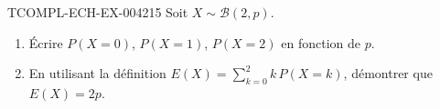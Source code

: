 \begin{exercice}{TCOMPL-ECH-EX-004}{2}{15}
Soit $X \sim \mathcal{B}(2,p)$.
\begin{enumerate}
  \item Écrire $P(X=0)$, $P(X=1)$, $P(X=2)$ en fonction de $p$.
  \item En utilisant la définition $E(X) = \displaystyle\sum_{k=0}^{2} k\,P(X=k)$, démontrer que $E(X)=2p$.
\end{enumerate}
\end{exercice}
